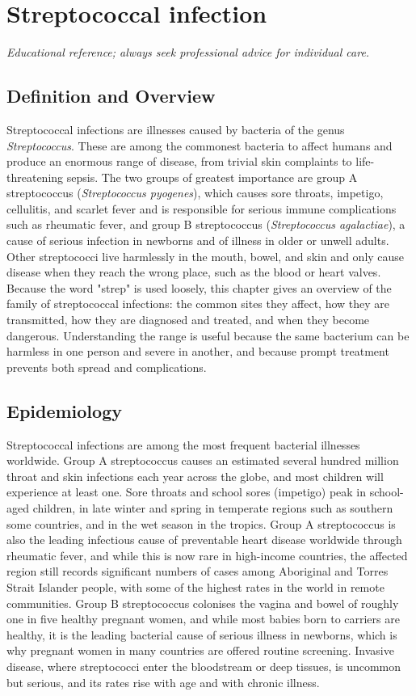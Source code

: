 \chapter{Streptococcal infection}

\medskip
\noindent\textit{Educational reference; always seek professional advice for individual care.}

\section*{Definition and Overview}
Streptococcal infections are illnesses caused by bacteria of the genus \textit{Streptococcus}. These are among the commonest bacteria to affect humans and produce an enormous range of disease, from trivial skin complaints to life-threatening sepsis. The two groups of greatest importance are group A streptococcus (\textit{Streptococcus pyogenes}), which causes sore throats, impetigo, cellulitis, and scarlet fever and is responsible for serious immune complications such as rheumatic fever, and group B streptococcus (\textit{Streptococcus agalactiae}), a cause of serious infection in newborns and of illness in older or unwell adults. Other streptococci live harmlessly in the mouth, bowel, and skin and only cause disease when they reach the wrong place, such as the blood or heart valves. Because the word "strep" is used loosely, this chapter gives an overview of the family of streptococcal infections: the common sites they affect, how they are transmitted, how they are diagnosed and treated, and when they become dangerous. Understanding the range is useful because the same bacterium can be harmless in one person and severe in another, and because prompt treatment prevents both spread and complications.

\section*{Epidemiology}
Streptococcal infections are among the most frequent bacterial illnesses worldwide. Group A streptococcus causes an estimated several hundred million throat and skin infections each year across the globe, and most children will experience at least one. Sore throats and school sores (impetigo) peak in school-aged children, in late winter and spring in temperate regions such as southern some countries, and in the wet season in the tropics. Group A streptococcus is also the leading infectious cause of preventable heart disease worldwide through rheumatic fever, and while this is now rare in high-income countries, the affected region still records significant numbers of cases among Aboriginal and Torres Strait Islander people, with some of the highest rates in the world in remote communities. Group B streptococcus colonises the vagina and bowel of roughly one in five healthy pregnant women, and while most babies born to carriers are healthy, it is the leading bacterial cause of serious illness in newborns, which is why pregnant women in many countries are offered routine screening. Invasive disease, where streptococci enter the bloodstream or deep tissues, is uncommon but serious, and its rates rise with age and with chronic illness.

